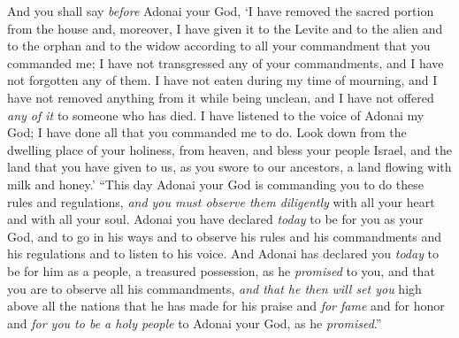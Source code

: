 \begin{biblechapter}
\verse And you shall say \textit{before} Adonai your God, ‘I have removed the sacred portion from the house and, moreover, I have given it to the Levite and to the alien and to the orphan and to the widow according to all your commandment that you commanded me; I have not transgressed any of your commandments, and I have not forgotten any of them.
\verse I have not eaten during my time of mourning, and I have not removed anything from it while being unclean, and I have not offered \textit{any of it} to someone who has died. I have listened to the voice of Adonai my God; I have done all that you commanded me to do.
\verse Look down from the dwelling place of your holiness, from heaven, and bless your people Israel, and the land that you have given to us, as you swore to our ancestors, a land flowing with milk and honey.’
\verse “This day Adonai your God is commanding you to do these rules and regulations, \textit{and you must observe them diligently} with all your heart and with all your soul.
\verse Adonai you have declared \textit{today} to be for you as your God, and to go in his ways and to observe his rules and his commandments and his regulations and to listen to his voice.
\verse And Adonai has declared you \textit{today} to be for him as a people, a treasured possession, as he \textit{promised} to you, and that you are to observe all his commandments,
\verse \textit{and that he then will set you} high above all the nations that he has made for his praise and \textit{for fame} and for honor and \textit{for you to be a holy people} to Adonai your God, as he \textit{promised}.”
\end{biblechapter}

